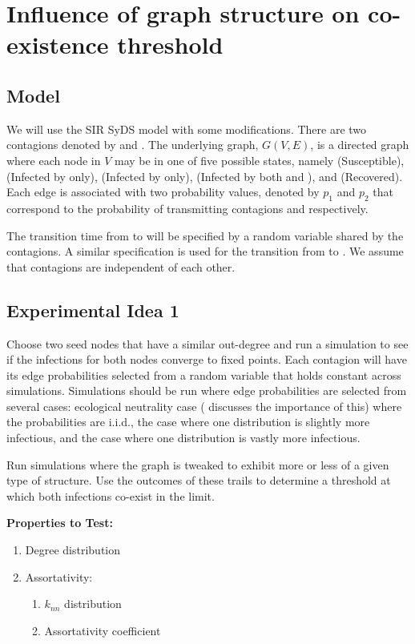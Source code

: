 \documentclass[11pt]{article}
\begin{document}
\section{Influence of graph structure on co-existence threshold} 

\subsection{Model}
We will use the SIR SyDS model with some modifications. There
are two contagions denoted by \cone{} and \ctwo. The underlying graph,
$G(V,E)$, is a directed graph where each node in $V$ may be in one of five
possible states, namely \sstate{} (Susceptible), 
\ione{} (Infected by \cone{} only), 
\itwo{} (Infected by \ctwo{} only), 
\ionetwo{} (Infected by both \cone{} and \ctwo{}), and
\rstate{} (Recovered). 
Each edge is associated with two probability values, denoted by $p_1$ and
$p_2$ that correspond to the probability of transmitting contagions
\cone{} and \ctwo{} respectively. 

The transition time from \sstate{} to \rstate{} will be specified by a random
variable shared by the contagions. A similar specification is used for
the transition from  \rstate{} to \sstate.
We assume that contagions are independent of each other.

\subsection{Experimental Idea 1}

Choose two seed nodes that have a similar out-degree and run a
simulation to see if the infections for both nodes converge to 
fixed points. Each contagion will have its edge probabilities
selected from a random variable that holds constant across simulations.
Simulations should be run where edge probabilities are selected
from several cases: ecological neutrality case (\cite{Lipsitch}
discusses the importance of this) where the probabilities are i.i.d.,
the case where one distribution is slightly more infectious, and
the case where one distribution is vastly more infectious.

Run simulations where the graph is tweaked  to exhibit more or less
of a given type of structure. Use the outcomes of these trails to
determine a threshold at which both infections co-exist in the
limit.

\medskip

\noindent
\textbf{Properties to Test:}
    \begin{enumerate}
        \item Degree distribution
        \item Assortativity:
        \begin{enumerate}
            \item $k_{nn}$ distribution
            \item Assortativity coefficient
        \end{enumerate}
    \end{enumerate}
\end{document}
